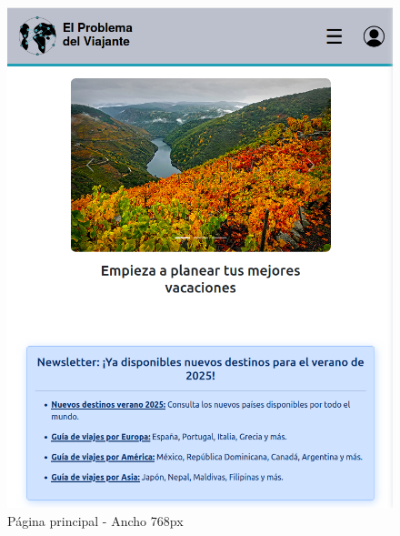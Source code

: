 \documentclass[11pt, a4paper]{book}
\begin{document}
	\begin{figure} [H]
		\centering
		\includegraphics[height=0.4\textheight]{CSS/1-5 768.png}
		\caption{Página principal - Ancho 768px}
	\end{figure}
\end{document}
